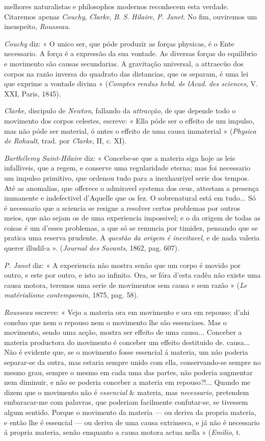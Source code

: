 melhores naturalistas e philosophos modernos reconhecem esta verdade. Citaremos apenas \emph{Couchy}, \emph{Clarke}, \emph{B}. \emph{S}. \emph{Hilaire}, \emph{P}. \emph{Janet}. No fim, ouviremos um insuspeito, \emph{Rousseau}.\par \emph{Couchy} diz: « O unico ser, que póde produzir as forças physicas, é o Ente necessario. A força é a expressão da sua vontade. As diversas forças do equilibrio e movimento são causas secundarias. A gravitação universal, a attraecüo dos corpos na razão inversa do quadrato das distancias, que os separam, é uma lei que exprime a vontade divina » (\emph{Comptes rendus hebd}. \emph{de lAcad}. \emph{des sciences}, V. XXI, Paris, 1845).\par \emph{Clarke}, discipulo de \emph{Newton}, fallando da \emph{attracção}, de que depende todo o movimento dos corpos celestes, escreve: « Ella póde ser o effeito de um impulso, mas não póde ser material, ó antes o effeito de uma causa immaterial » (\emph{Physica de Rohault}, trad. por \emph{Clarke}, II, c. XI).\par \emph{Barthélemy Saint-Hilaire} diz: « Concebe-se que a materia siga hoje as leis infalliveis, que a regem, e conserve uma regularidade eterna; mas foi necessario um impulso primitivo, que ordenou tudo para a inexhauriyel serie dos tempos. Até as anomalias, que offerece o admiravel systema dos ceus, attestam a presença immanente e indefectivel d'Aquelle que os fez. O sobrenatural está em tudo... Só é necessario que a sciencia se resigne a resolver certos problemas por outros meios, que não sejam os de uma experiencia impossivel; e o da origem de todas as coisas é um d'esses problemas, a que só se renuncia por timidez, pensando que se pratica uma reserva prudente. A \emph{questão da origem é inevitavel}, e de nada valeria querer illudil-a ». (\emph{Journal des Savants}, 1862, pag. 607).\par \emph{P}. \emph{Janet} diz: « A experiencia não mostra senão que um corpo é movido por outro, e este por outro, e isto ao infinito. Ora, se fóra d'esta cadêa não existe uma causa motora, teremos uma serie de movimentos sem causa e sem razão » (\emph{Le matérialisme contemporain}, 1875, pag. 58).\par \emph{Rousseau} escreve: « Vejo a materia ora em movimento e ora em repouso; d'ahi coneluo que nem o repouso nem o movimento lhe são essenciaes. Mas o movimento, sendo uma acção, mostra ser effeito de uma causa... Conceber a materia productora do movimento é conceber um effeito destituido de. causa... Não é evidente que, se o movimento fosse essencial á materia, um não poderia separar-se da outra, mas estaria sempre unido com ella, conservando-se sempre no mesmo grau, sempre o mesmo em cada uma das partes, não poderia augmentar nem diminuir, e não se poderia conceber a materia em repouso?!... Quando me dizem que o movimento não é \emph{essencial} \& materia, mas \emph{necessario}, pretendem embaracar-me com palavras, que poderiam facilmente confutar-se, se tivessem algum sentido. Porque o movimento da materia --- ou deriva da propria materia, e então lhe é essencial --- ou deriva de uma causa extrinseca, e já não é necessario á propria materia, senão emquanto a causa motora actua nella » (\emph{Emilio}, t. 